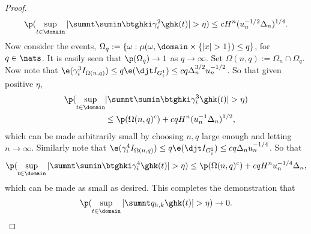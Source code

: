 \begin{proof}
\begin{align}
  \p( \sup_{t \in \domain}\vert \sumnt \sumin \btghki \gamma^2_i \ghk(t)\vert > \eta) \le cH^n (u^{-1/2}_n\Delta_n)^{1/4}. \notag \end{align}
Now consider the events, $\Omega_q := \{\omega : \mu(\omega, \domain  \times \{\vert x \vert > 1\} ) \le q \}$, for     $q \in \nats$. It is easily seen that $\p(\Omega_q) \to 1$ as $q \to \infty$. Set $\Omega(n, q) := \Omega_n \cap \Omega_q$. Now note that   $\e(\gamma^3_i I_{\Omega(n,q)}) \le q \e(\djt I_{G^1_i}) \le c q \Delta_n^{3/2} u_n^{-1/2}$. So that given positive $\eta$,
\begin{align} 
  \p( \sup_{t \in \domain}&\vert \sumnt \sumin \btghki \gamma^3_i \ghk(t)\vert > \eta) \notag \\ &\le \p(\Omega(n,q)^c) + cqH^n (u^{-1}_n\Delta_n)^{1/2}, \notag \end{align}
which can be made arbitrarily small by  choosing $n,q$ large enough and letting $n \to \infty$.  Similarly note that $\e(\gamma^4_i I_{\Omega(n,q)}) \le q \e(\djt I_{G^2_i}) \le c q \Delta_n u_n^{-1/4}$. So that 
\begin{align} 
  \p( \sup_{t \in \domain}\vert \sumnt \sumin \btghki \gamma^4_i \ghk(t)\vert > \eta) \le \p(\Omega(n,q)^c) + cqH^n u^{-1/4}_n\Delta_n, \notag \end{align}
which can be made as small as desired. This completes the demonstration  that 
\begin{align}
  \p(\sup_{t \in \domain} \vert \sumnt q_{h,k} \ghk(t) \vert > \eta) \to 0.\notag
  \label{}
\end{align}
\begin{comment}
Now, arguing as in Theorem 4.1 of \cite{Mancini2009}, note that on $ A_i \cap C_i^c$, it is the case that  $2u_n^{1/2} - \vert \dxf \vert < \vert \djt\vert - \vert \dxf\vert \le \vert \dx \vert \le u_n^{1/2}$, so that $u_n^{1/2} < \vert \dxf \vert < \vert \djl \vert + \vert \dxc \vert $. In turn, the last inequality implies that either $\vert \djl \vert > u^{1/2}_n/2$ or  $\vert \dxc \vert > u^{1/2}_n/2$. Now, for sufficiently large $n$, it is almost surely never the case that $\vert \dxc \vert > u^{1/2}_n/2$ for some $i$,  $0 \le  i  \le n -1$. Hence,  for positive $\delta$, \begin{align} \p(\vert&\sumt q_{h,k} \ghk(t) \vert > \delta/2) \notag \\ &\le \p(    \cup_i\{ \mu( (t_i, t_{i+1}] \times \{\vert x \vert > 1 \} ) > 0,  (\djt)^2 > u_n\}) \notag \\ & \le c n^{-1} \kappa u_n^{-1}.\end{align}

\end{comment}
\end{proof}
